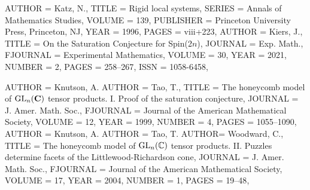 \begin{bibdiv}
\begin{biblist}
 {
    AUTHOR = {Katz, N.},
     TITLE = {Rigid local systems},
    SERIES = {Annals of Mathematics Studies},
    VOLUME = {139},
 PUBLISHER = {Princeton University Press, Princeton, NJ},
      YEAR = {1996},
     PAGES = {viii+223},
}
 {
    AUTHOR = {Kiers, J.},
     TITLE = {On the {S}aturation {C}onjecture for {S}pin(2{$n$})},
   JOURNAL = {Exp. Math.},
  FJOURNAL = {Experimental Mathematics},
    VOLUME = {30},
      YEAR = {2021},
    NUMBER = {2},
     PAGES = {258--267},
      ISSN = {1058-6458},
}




 {
    AUTHOR = {Knutson, A.}
    AUTHOR =  {Tao, T.},
     TITLE = {The honeycomb model of {${\rm GL}_n({\bf C})$} tensor
              products. {I}. {P}roof of the saturation conjecture},
   JOURNAL = {J. Amer. Math. Soc.},
  FJOURNAL = {Journal of the American Mathematical Society},
    VOLUME = {12},
      YEAR = {1999},
    NUMBER = {4},
     PAGES = {1055--1090},
}
 {
    AUTHOR = {Knutson, A.}
    AUTHOR =  {Tao, T.}
    AUTHOR=  {Woodward, C.},
     TITLE = {The honeycomb model of {${\rm GL}_n(\Bbb C)$} tensor products.
              {II}. {P}uzzles determine facets of the
              {L}ittlewood-{R}ichardson cone},
   JOURNAL = {J. Amer. Math. Soc.},
  FJOURNAL = {Journal of the American Mathematical Society},
    VOLUME = {17},
      YEAR = {2004},
    NUMBER = {1},
     PAGES = {19--48},
}


\end{biblist}
\end{bibdiv}
